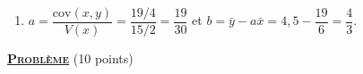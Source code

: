 \begin{description}
\begin{enumerate}
\[            \]
            $r = \dfrac{\mathrm{cov}(x, y)}{\sqrt{V(x)\,V(y)}} = \dfrac{19}{\sqrt{390}}$, 
            $r$ est proche de $1$ : il existe une forte corr\'elation lin\'eaire positive entre les notes de musique et de chant
            (un ajustement affine est justifi\'e).
         \item {}
            $a = \dfrac{\mathrm{cov}(x, y)}{V(x)} = \dfrac{19/4}{15/2} = \dfrac{19}{30}$ et $b = \bar{y} - a\bar{x} = 4{,}5 - \dfrac{19}{6} = \dfrac{4}{3}$.
            \par\noindent{}
      \end{enumerate}
\end{description}
\noindent \underline{\textsc{\textbf{Probl\`eme}}} (10 points)
